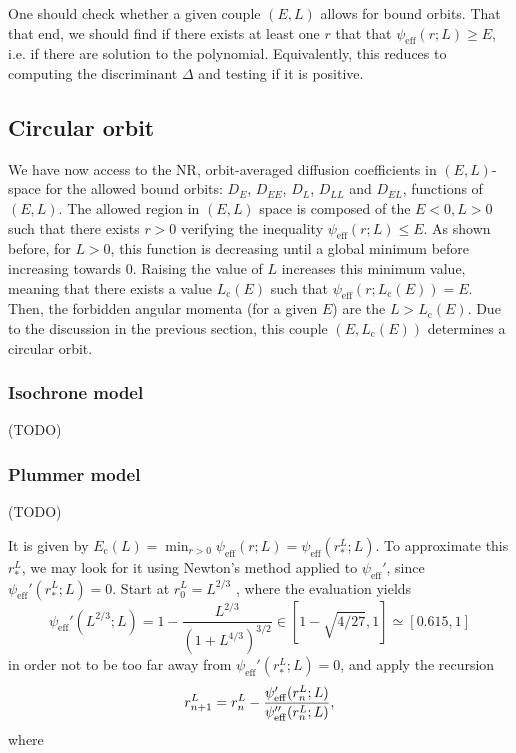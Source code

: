 \documentclass[11pt]{article}
\newcommand{\dE}{D_{E}}
\newcommand{\dL}{D_{L}}
\newcommand{\dEE}{D_{EE}}
\newcommand{\dLL}{D_{LL}}
\newcommand{\dEL}{D_{EL}}
\newcommand{\psieff}{\psi_{\mathrm{eff}}}
\newcommand{\Ec}{E_{{\mathrm{c}}}}
\newcommand{\Lc}{L_{{\mathrm{c}}}}
\begin{document}
One should check whether a given couple $(E,L)$ allows for bound
orbits. That that end, we should find if there exists at least one
$r$ that that $\psieff(r;L)\geq E$, i.e. if there are solution
to the polynomial. Equivalently, this reduces to computing the discriminant
$\Delta$ and testing if it is positive.

\subsection{Circular orbit}
\label{subsec:Circular_Energy}

We have now access to the NR, orbit-averaged diffusion coefficients
in $(E,L)$-space for the allowed bound orbits: $\dE$, $\dEE$,
$\dL$, $\dLL$ and $\dEL$, functions of
$(E,L)$. The allowed region in $(E,L)$ space is composed of the
$E < 0 , L> 0$ such that there exists $r>0$ verifying the inequality
$\psieff(r;L)\leq E$. As shown before, for $L>0$, this function  is decreasing until a global
minimum before increasing towards $0$. Raising the value of $L$
increases this minimum value, meaning that there exists a value $\Lc(E)$
such that $\psieff(r;\Lc(E))=E$. Then, the forbidden angular
momenta (for a given $E$) are the $L>\Lc(E)$. Due to the
discussion in the previous section, this couple $(E,\Lc(E))$
determines a circular orbit.

\subsubsection{Isochrone model}
\label{subsubsec:PlummerCircularOrbit}

(TODO)

\subsubsection{Plummer model}
\label{subsubsec:PlummerCircularOrbit}

(TODO)

It is given by $\Ec(L)=\min_{r>0}\psieff(r;L)=\psieff(r_{*}^{L};L)$.
To approximate this $r_{*}^{L}$, we may look for it using Newton's
method applied to $\psieff'$, since $\psieff'(r_{*}^{L};L)=0$.
Start at $r_{0}^{L}=L^{2/3}$ , where the evaluation yields
\begin{equation}
\psieff'(L^{2/3};L)=1-\frac{L^{2/3}}{(1+L^{4/3})^{3/2}}\in[1-\sqrt{4/27},1]\simeq[0.615,1]
\label{eq:start_recursion_Ec}
\end{equation}
in order not to be too far away from $\psieff'(r_{*}^{L};L)=0$,
and apply the recursion
\begin{equation}
r_{n+1}^{L}=r_{n}^{L}-\frac{\psi'_{{\rm eff}}(r_{n}^{L};L)}{\psi''_{{\rm eff}}(r_{n}^{L};L)},
\label{eq:recursion_Ec}
\end{equation}
where
\end{document}
